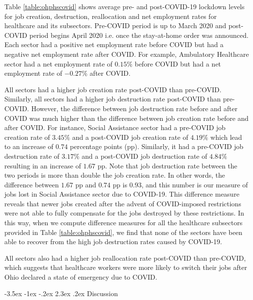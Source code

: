 \documentclass[11pt]{article}
\makeatletter
\renewcommand\section{\@startsection {section}{1}{\z@}%
                                       {-3.5ex \@plus -1ex \@minus -.2ex}%
                                       {2.3ex \@plus.2ex}%
                                       {\normalfont\fontfamily{phv}\fontsize{16}{19}\bfseries}}
\makeatother
\begin{document}
Table \ref{table:ohphscovid} shows average pre- and post-COVID-19 lockdown levels for job creation, destruction, reallocation and net employment rates for healthcare and its subsectors. Pre-COVID period is up to March 2020 and post-COVID period begins April 2020 i.e. once the stay-at-home order was announced. 
Each sector had a positive net employment rate before COVID but had a negative net employment rate after COVID. For example, Ambulatory Healthcare sector had a net employment rate of $0.15\%$ before COVID but had a net employment rate of $-0.27\%$ after COVID.

\noindent
All sectors had a higher job creation rate post-COVID than pre-COVID. Similarly, all sectors had a higher job destruction rate post-COVID than pre-COVID. However, the difference between job destruction rate before and after COVID was much higher than the difference between job creation rate before and after COVID. For instance, Social Assistance sector had a pre-COVID job creation rate of $3.45\%$ and a post-COVID job creation rate of $4.19\%$ which lead to an increase of $0.74$ percentage points (pp). Similarly, it had a pre-COVID job destruction rate of $3.17\%$ and a post-COVID job destruction rate of $4.84\%$ resulting in an increase of $1.67$ pp. Note that job destruction rate between the two periods is more than double the job creation rate. In other words, the difference between $1.67$ pp and $0.74$ pp is $0.93$, and this number is our measure of jobs lost in Social Assistance sector due to COVID-19. This difference measure reveals that newer jobs created after the advent of COVID-imposed restrictions were not able to fully compensate for the jobs destroyed by these restrictions. In this way, when we compute difference measures for all the healthcare subsectors provided in Table \ref{table:ohphscovid}, we find that none of the sectors have been able to recover from the high job destruction rates caused by COVID-19.

\noindent
All sectors also had a higher job reallocation rate post-COVID than pre-COVID, which suggests that healthcare workers were more likely to switch their jobs after Ohio declared a state of emergency due to COVID.


	
\section{Discussion} \label{s:discussion}
\end{document}

